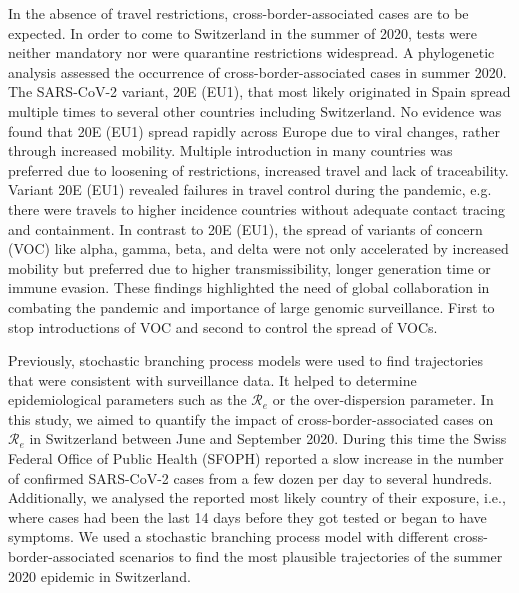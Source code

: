 \documentclass[10pt, a4paper, twoside]{article}
\begin{document}
\begin{multicols}{2}
In the absence of travel restrictions, cross-border-associated cases are to be expected.\cite{russell_effect_2021}
In order to come to Switzerland in the summer of 2020, tests were neither mandatory nor were quarantine restrictions widespread.
A phylogenetic analysis assessed the occurrence of cross-border-associated cases in summer 2020.\cite{hodcroft_spread_2021}
The SARS-CoV-2 variant, 20E (EU1), that most likely originated in Spain spread multiple times to several other countries including Switzerland.\cite{hodcroft_spread_2021}
No evidence was found that 20E (EU1) spread rapidly across Europe due to viral changes, rather through increased mobility.\cite{hodcroft_spread_2021}
Multiple introduction in many countries was preferred due to loosening of restrictions, increased travel and lack of traceability.\cite{hodcroft_spread_2021}
Variant 20E (EU1) revealed failures in travel control during the pandemic, e.g. there were travels to higher incidence countries without adequate contact tracing and containment.\cite{hodcroft_spread_2021}
In contrast to 20E (EU1), the spread of variants of concern (VOC) like alpha, gamma, beta, and delta were not only accelerated by increased mobility but preferred due to higher transmissibility, longer generation time or immune evasion.\cite{davies_estimated_2021,faria_genomics_2021,tegally_detection_2021,cherian_convergent_2021,world_health_organisation_who_tracking_2021}
These findings highlighted the need of global collaboration in combating the pandemic and importance of large genomic surveillance.
First to stop introductions of VOC and second to control the spread of VOCs.
\break
\par
Previously, stochastic branching process models were used to find trajectories that were consistent with surveillance data.\cite{althaus_ebola_2015,riou_pattern_2020}
It helped to determine epidemiological parameters such as the $\mathcal{R}_e$ or the over-dispersion parameter.\cite{althaus_ebola_2015,riou_pattern_2020}
In this study, we aimed to quantify the impact of cross-border-associated cases on $\mathcal{R}_e$ in Switzerland between June and September 2020.
During this time the Swiss Federal Office of Public Health (SFOPH) reported a slow increase in the number of confirmed SARS-CoV-2 cases from a few dozen per day to several hundreds.
Additionally, we analysed the reported most likely country of their exposure, i.e., where cases had been the last 14 days before they got tested or began to have symptoms.
We used a stochastic branching process model with different cross-border-associated scenarios to find the most plausible trajectories of the summer 2020 epidemic in Switzerland.


\end{multicols}
\end{document}
